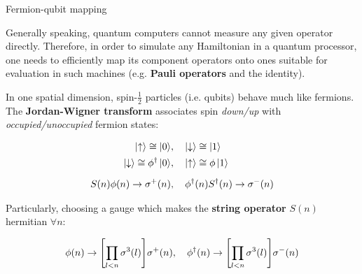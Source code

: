 \documentclass[9pt, handout, aspectratio=169]{beamer}	%
\begin{document}
\begin{frame}{Fermion-qubit mapping}

	Generally speaking, quantum computers cannot measure any given operator directly. Therefore, in order to simulate any Hamiltonian in a quantum processor, one needs to efficiently map its component operators onto ones suitable for evaluation in such machines (e.g. \textbf{Pauli operators} and the identity).

	\medskip \pause

	In one spatial dimension, spin-$\frac{1}{2}$ particles (i.e. qubits) behave much like fermions. The \textbf{Jordan-Wigner transform} associates spin \emph{down/up} with \emph{occupied/unoccupied} fermion states:

	\begin{align*}
		\ket{\ua} \cong \ket{0} &\qc
			\ket{\da} \cong \ket{1} \\
    \ket{\da} \cong \phi^{\dagger}\ket{0} &\qc
			\ket{\ua} \cong \phi\ket{1} \\[5pt]
			S(n)\phi(n) \ra \sigma^{+}(n) &\qc
			\phi^{\dagger}(n)S^{\dagger}(n) \ra \sigma^{-}(n)
	\end{align*}

	\pause

	Particularly, choosing a gauge which makes the \textbf{string operator} $S(n)$ hermitian $\forall n$:

	\begin{gather*}
		\phi(n) \ra \qty[\prod_{l<n} \sigma^3(l)]\sigma^{+}(n) \qc
		\phi^{\dagger}(n) \ra \qty[\prod_{l<n} \sigma^3(l)]\sigma^{-}(n)
	\end{gather*}

\end{frame}

\end{document}

